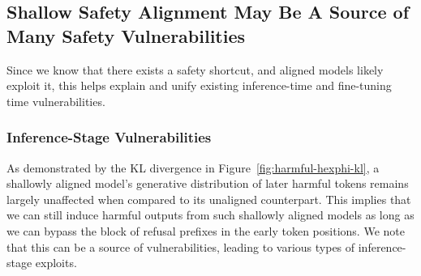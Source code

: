 


\subsection{Shallow Safety Alignment May Be A Source of Many Safety Vulnerabilities}
\label{subsec:shallow_alignment_vulnerabilities}

Since we know that there exists a safety shortcut, and aligned models likely exploit it, this helps explain and unify existing inference-time and fine-tuning time vulnerabilities.

\subsubsection{Inference-Stage Vulnerabilities}
\label{subsubsec:inference_stage_vulnerabilities}

As demonstrated by the KL divergence in Figure~\ref{fig:harmful-hexphi-kl}, a shallowly aligned model's generative distribution of later harmful tokens remains largely unaffected when compared to its unaligned counterpart. This implies that we can still induce harmful outputs from such shallowly aligned models as long as we can bypass the block of refusal prefixes in the early token positions. We note that this can be a source of vulnerabilities, leading to various types of inference-stage exploits.




